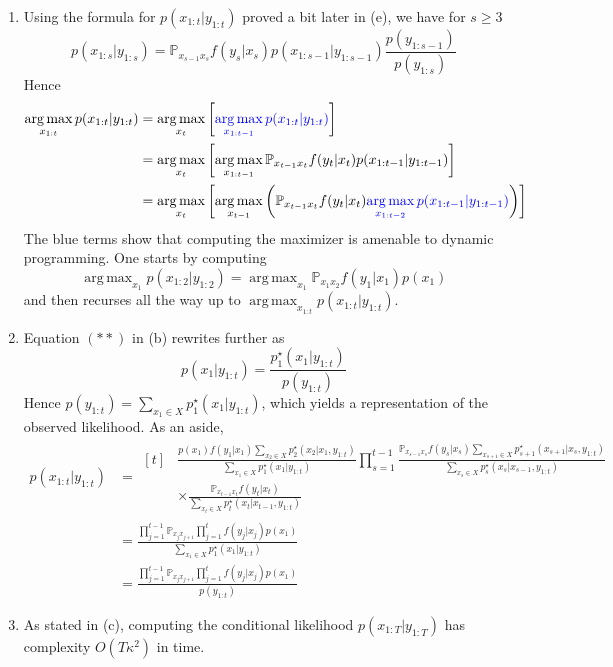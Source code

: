 \documentclass[a4paper,11pt, hidelinks]{article}
\DeclareMathOperator*{\argmax}{arg\,max}
\begin{document}
\begin{enumerate}[label=(\alph*)]
	\item Using the formula for $p(x_{1:t}|y_{1:t})$ proved a bit later in (e), we have for $s\geq 3$ $$p(x_{1:s}|y_{1:s}) = \mathbb P_{x_{s-1} x_s} f(y_s|x_s) p(x_{1:s-1}|y_{1:s-1}) \frac{p(y_{1:s-1})}{p(y_{1:s})}$$
	Hence  $$\begin{aligned}
	\argmax_{x_{1:t}} p(x_{1:t}|y_{1:t}) &= \argmax_{x_t}\left[\mathbin{\textcolor{blue}{\argmax_{x_{1:t-1}} p(x_{1:t}|y_{1:t})}} \right]\\
	&= \argmax_{x_t}\left[\argmax_{x_{1:t-1}}\mathbb P_{x_{t-1} x_t} f(y_t|x_t) p(x_{1:t-1}|y_{1:t-1}) \right]\\
	&= \argmax_{x_t}\left[\argmax_{x_{t-1}}\left( \mathbb P_{x_{t-1} x_t} f(y_t|x_t) \mathbin{\textcolor{blue}{\argmax_{x_{1:t-2}} p(x_{1:t-1}|y_{1:t-1})}} \right)\right]
	\end{aligned}
	$$
	The blue terms show that computing the maximizer is amenable to dynamic programming. One starts by computing $$\argmax_{x_{1}} p(x_{1:2}|y_{1:2}) = \argmax_{x_{1}} \mathbb P_{x_{1} x_2} f(y_1|x_1)p(x_1)$$
	and then recurses all the way up to $\argmax_{x_{1:t}} p(x_{1:t}|y_{1:t})$.

	\item Equation $(**)$ in (b) rewrites further as $$p(x_1|y_{1:t}) =  \frac{p_1^\star(x_1|y_{1:t})}{p(y_{1:t})}$$
	Hence $p(y_{1:t}) = \sum_{x_1\in X} p_1^\star(x_1|y_{1:t})$, which yields a representation of the observed likelihood.\newline \newline
	As an aside, $$\begin{aligned}
	p(x_{1:t}|y_{1:t})  &= \begin{aligned}[t]&\frac{p(x_1) f(y_1|x_1) \sum_{x_2\in X} p_2^\star(x_2|x_1,y_{1:t})}{\sum_{x_1\in X} p_1^\star(x_1|y_{1:t})} \prod_{s=1}^{t-1} \frac{\mathbb P_{x_{s-1} x_s} f(y_s|x_s) \sum_{x_{s+1}\in X} p_{s+1}^\star(x_{s+1}|x_{s},y_{1:t})}{\sum_{x_s\in X} p_s^\star(x_s|x_{s-1},y_{1:t})}\\ &\times \frac{\mathbb P_{x_{t-1} x_t} f(y_t|x_t)}{\sum_{x_t\in X} p_t^\star(x_t|x_{t-1},y_{1:t})}\end{aligned}\\
	&= \frac{\prod_{j=1}^{t-1}\mathbb P_{x_{j} x_{j+1}} \prod_{j=1}^{t}f(y_j|x_j)p(x_1)}{\sum_{x_1\in X} p_1^\star(x_1|y_{1:t})}\\
	&= \frac{\prod_{j=1}^{t-1}\mathbb P_{x_{j} x_{j+1}} \prod_{j=1}^{t}f(y_j|x_j)p(x_1)}{p(y_{1:t})}
	\end{aligned}
	$$
	
	\item As stated in (c), computing the conditional likelihood $p(x_{1:T}|y_{1:T})$ has complexity $O(T\kappa^2)$ in time.
\end{enumerate}
\end{document}
